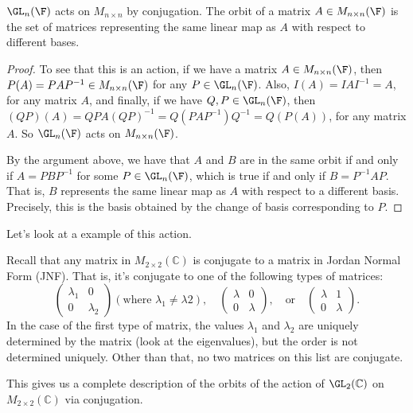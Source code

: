 \documentclass[a4paper]{scrartcl}
\begin{document}
\begin{proposition}
	$\GL_n(\F)$ acts on $M_{n \times n}$ by conjugation. The orbit of a matrix $A \in M_{n \times n}(\F)$ is the set of matrices representing the same linear map as $A$ with respect to different bases.
\end{proposition}
\begin{proof}
	To see that this is an action, if we have a matrix $A \in M_{n \times n}(\F)$, then $P(A) = PAP^{-1} \in M_{n \times n}(\F)$ for any $P \in \GL_n(\F)$.
	Also, $I(A) = IAI^{-1} = A$, for any matrix $A$, and finally, if we have $Q, P \in \GL_n(\F)$, then $(QP)(A) = QPA (QP)^{-1} = Q(PAP^{-1})Q^{-1} = Q(P(A))$, for any matrix $A$.
	So $\GL_n(\F)$ acts on $M_{n \times n}(\F)$.

	By the argument above, we have that $A$ and $B$ are in the same orbit if and only if $A = PBP^{-1}$ for some $P \in \GL_n(\F)$, which is true if and only if $B = P^{-1}AP$.
	That is, $B$ represents the same linear map as $A$ with respect to a different basis. Precisely, this is the basis obtained by the change of basis corresponding to $P$.
\end{proof}

Let's look at a example of this action.

\begin{example}
Recall that any matrix in $M_{2 \times 2}(\mathbb{C})$ is conjugate to a matrix in Jordan Normal Form (JNF). That is, it's conjugate to one of the following types of matrices:
$$
\begin{pmatrix}
	\lambda_1 & 0 \\ 0 & \lambda_2
\end{pmatrix} (\text{where }\lambda_1 \neq \lambda 2), \quad \begin{pmatrix}
	\lambda & 0 \\ 0 & \lambda
\end{pmatrix}, \quad \text{or} \quad \begin{pmatrix}
	\lambda & 1 \\ 0 & \lambda
\end{pmatrix}.
$$
In the case of the first type of matrix, the values $\lambda_1$ and $\lambda_2$ are uniquely determined by the matrix (look at the eigenvalues), but the order is not determined uniquely. Other than that, no two matrices on this list are conjugate.

This gives us a complete description of the orbits of the action of $\GL_2(\mathbb{C})$ on $M_{2 \times 2}(\mathbb{C})$ via conjugation.
\end{example}
\end{document}
